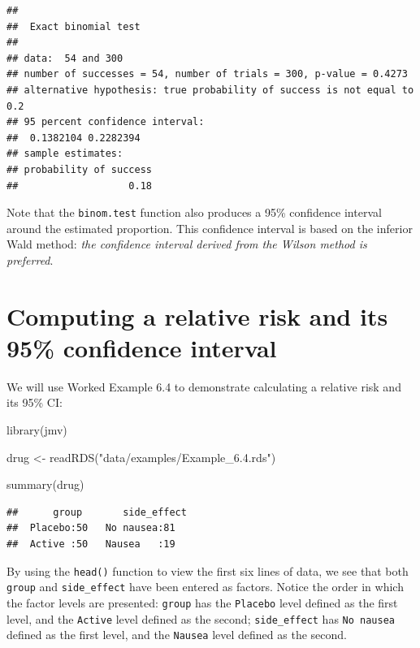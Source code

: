 \documentclass[
]{memoir}
\newenvironment{Shaded}{\begin{snugshade}}{\end{snugshade}}
\newcommand{\FunctionTok}[1]{\textcolor[rgb]{0.00,0.00,0.00}{#1}}
\newcommand{\NormalTok}[1]{#1}
\newcommand{\OtherTok}[1]{\textcolor[rgb]{0.56,0.35,0.01}{#1}}
\newcommand{\StringTok}[1]{\textcolor[rgb]{0.31,0.60,0.02}{#1}}
\begin{document}
\begin{verbatim}
## 
##  Exact binomial test
## 
## data:  54 and 300
## number of successes = 54, number of trials = 300, p-value = 0.4273
## alternative hypothesis: true probability of success is not equal to 0.2
## 95 percent confidence interval:
##  0.1382104 0.2282394
## sample estimates:
## probability of success 
##                   0.18
\end{verbatim}

Note that the \texttt{binom.test} function also produces a 95\% confidence interval around the estimated proportion. This confidence interval is based on the inferior Wald method: \emph{the confidence interval derived from the Wilson method is preferred}.

\hypertarget{computing-a-relative-risk-and-its-95-confidence-interval}{%
\section{Computing a relative risk and its 95\% confidence interval}\label{computing-a-relative-risk-and-its-95-confidence-interval}}

We will use Worked Example 6.4 to demonstrate calculating a relative risk and its 95\% CI:

\begin{Shaded}
\begin{Highlighting}[]
\FunctionTok{library}\NormalTok{(jmv)}

\NormalTok{drug }\OtherTok{\textless{}{-}} \FunctionTok{readRDS}\NormalTok{(}\StringTok{"data/examples/Example\_6.4.rds"}\NormalTok{)}

\FunctionTok{summary}\NormalTok{(drug)}
\end{Highlighting}
\end{Shaded}

\begin{verbatim}
##      group       side_effect
##  Placebo:50   No nausea:81  
##  Active :50   Nausea   :19
\end{verbatim}

By using the \texttt{head()} function to view the first six lines of data, we see that both \texttt{group} and \texttt{side\_effect} have been entered as factors. Notice the order in which the factor levels are presented: \texttt{group} has the \texttt{Placebo} level defined as the first level, and the \texttt{Active} level defined as the second; \texttt{side\_effect} has \texttt{No\ nausea} defined as the first level, and the \texttt{Nausea} level defined as the second.
\end{document}
